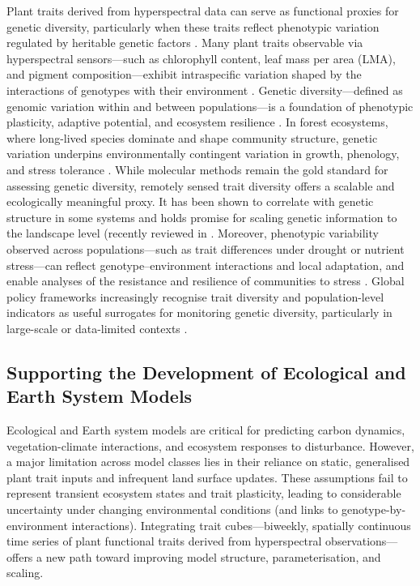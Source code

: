 \documentclass[pdflatex,sn-mathphys-num]{sn-jnl}%
\theoremstyle{thmstyleone}%
\theoremstyle{thmstyletwo}%
\theoremstyle{thmstylethree}%
\begin{document}
Plant traits derived from hyperspectral data can serve as functional proxies for genetic diversity, particularly when these traits reflect phenotypic variation regulated by heritable genetic factors \citep{Violle2007, Funk2017, Zhao2021}. Many plant traits observable via hyperspectral sensors—such as chlorophyll content, leaf mass per area (LMA), and pigment composition—exhibit intraspecific variation shaped by the interactions of genotypes with their environment \citep{Asner2015, Schweiger2018}. Genetic diversity—defined as genomic variation within and between populations—is a foundation of phenotypic plasticity, adaptive potential, and ecosystem resilience \citep{Barrett2008, Jump2009}. In forest ecosystems, where long-lived species dominate and shape community structure, genetic variation underpins environmentally contingent variation in growth, phenology, and stress tolerance \citep{Petit2006, Alfaro2014}. While molecular methods remain the gold standard for assessing genetic diversity, remotely sensed trait diversity offers a scalable and ecologically meaningful proxy. It has been shown to correlate with genetic structure in some systems and holds promise for scaling genetic information to the landscape level (recently reviewed in \cite{cavender2025spectral}. Moreover, phenotypic variability observed across populations—such as trait differences under drought or nutrient stress—can reflect genotype–environment interactions and local adaptation, and enable analyses of the resistance and resilience of communities to stress \citep{Shakoor2017, Bai2023}. Global policy frameworks increasingly recognise trait diversity and population-level indicators as useful surrogates for monitoring genetic diversity, particularly in large-scale or data-limited contexts \citep{Hoban2020, Hoban2024}.


\subsection{Supporting the Development of Ecological and Earth System Models}\label{subsec3}

Ecological and Earth system models are critical for predicting carbon dynamics, vegetation-climate interactions, and ecosystem responses to disturbance. However, a major limitation across model classes lies in their reliance on static, generalised plant trait inputs and infrequent land surface updates. These assumptions fail to represent transient ecosystem states and trait plasticity, leading to considerable uncertainty under changing environmental conditions (and links to genotype-by-environment interactions). Integrating trait cubes—biweekly, spatially continuous time series of plant functional traits derived from hyperspectral observations—offers a new path toward improving model structure, parameterisation, and scaling.
\end{document}
